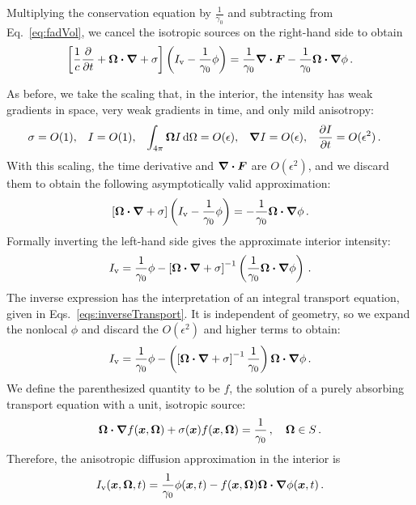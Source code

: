 Multiplying the conservation equation by $\frac{1}{\gamma_0}$ and subtracting
from Eq.~\eqref{eq:fadVol}, we cancel the isotropic sources on the right-hand
side to obtain
\begin{equation*}
  \left[ \frac{1}{c}\frac{\partial }{\partial t}
  + \bm{\Omega}\bm{\cdot} \bm{\nabla}
  + \sigma \right]
   \left( I_\mathrm{v}
  - \frac{1}{\gamma_0} \phi \right)
  = \frac{1}{\gamma_0} \bm{\nabla} \bm{\cdot}\bm{F} -
  \frac{1}{\gamma_0} \bm{\Omega}\bm{\cdot} \bm{\nabla} \phi\,.
\end{equation*}

As before, we take the scaling that, in the interior, the intensity has weak
gradients in space, very weak gradients in time, and only mild anisotropy:
\begin{align} \label{eq:ansatz_6}
  \sigma &= O(1), &
  I &= O(1), &
  \int_{4\pi} \bm{\Omega} I \mathop{}\!\mathrm{d}\Omega &= O(\epsilon), &
  \bm{\nabla} I &= O(\epsilon), &
  \frac{\partial I}{\partial t} &= O(\epsilon^2) \,.
\end{align}
With this scaling, the time derivative and $\bm{\nabla} \bm{\cdot}\bm{F}$ are
$O(\epsilon^2)$, and we discard them to obtain the following asymptotically
valid approximation:
\begin{equation*}
  \left[ \bm{\Omega}\bm{\cdot} \bm{\nabla} + \sigma \right]
  \left( I_\mathrm{v} - \frac{1}{\gamma_0} \phi \right)
  =  -\frac{1}{\gamma_0} \bm{\Omega}\bm{\cdot} \bm{\nabla} \phi\,.
\end{equation*}
Formally inverting the left-hand side gives the approximate interior
intensity:
\begin{equation*}
  I_\mathrm{v} = \frac{1}{\gamma_0} \phi 
  - \left[ \bm{\Omega}\bm{\cdot} \bm{\nabla} + \sigma \right]^{-1} \left( \frac{1}{\gamma_0}
  \bm{\Omega}\bm{\cdot} \bm{\nabla} \phi \right)\,.
\end{equation*}
The inverse expression has the interpretation of an integral transport equation,
given in Eqs.~\eqref{eqs:inverseTransport}. It is independent of geometry, so we
expand the nonlocal $\phi$ and discard the $O(\epsilon^2)$ and higher terms to
obtain:
\begin{equation*}
  I_\mathrm{v} = \frac{1}{\gamma_0} \phi 
  - \left( \left[ \bm{\Omega}\bm{\cdot} \bm{\nabla} + \sigma \right]^{-1} \frac{1}{\gamma_0}
  \right) \bm{\Omega}\bm{\cdot} \bm{\nabla} \phi \,.
\end{equation*}
We define the parenthesized quantity to be $f$, the solution of a purely
absorbing transport equation with a unit, isotropic source:
\begin{equation} \label{eq:fadFVol}
  \bm{\Omega}\bm{\cdot} \bm{\nabla} f(\bm{x}, \bm{\Omega})
  + \sigma(\bm{x}) f (\bm{x}, \bm{\Omega})
= \frac{1}{\gamma_0} \,, \quad \bm{\Omega} \in S\,.
\end{equation}
Therefore, the anisotropic diffusion approximation in the interior is
\begin{equation}\label{eq:fadVolApproxFinal}
  I_\mathrm{v}(\bm{x},\bm{\Omega},t)
  = \frac{1}{\gamma_0} \phi(\bm{x},t)
  - f(\bm{x}, \bm{\Omega}) \bm{\Omega}\bm{\cdot} \bm{\nabla} \phi(\bm{x},t) \,.
\end{equation}

